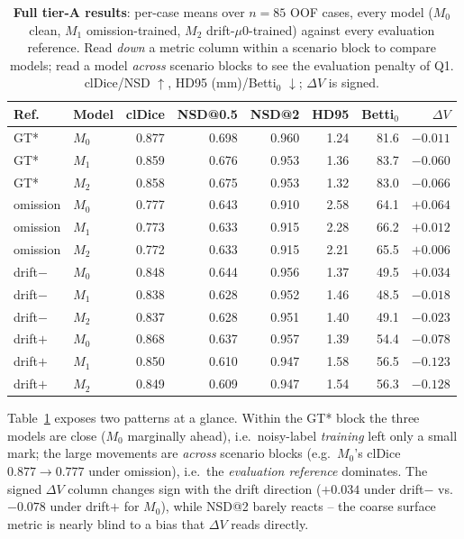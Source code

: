 \documentclass[
    bookmarks, bookmarksnumbered, bookmarksopen,
    colorlinks=true, citecolor=blue, linkcolor=blue, urlcolor=blue
]{techrep}
\begin{document}
\begin{table}[htb]
  \centering
  \caption{\textbf{Full tier-A results}: per-case means over $n{=}85$ OOF cases, every model
  ($M_0$ clean, $M_1$ omission-trained, $M_2$ drift-$\mu0$-trained) against every evaluation
  reference. Read \emph{down} a metric column within a scenario block to compare models; read a
  model \emph{across} scenario blocks to see the evaluation penalty of Q1. clDice/NSD $\uparrow$,
  HD95 (mm)/Betti$_0$ $\downarrow$; $\Delta V$ is signed.}
  \label{tab:full}
  \small
  \begin{tabular}{llrrrrrr}
    \toprule
    Ref. & Model & clDice & NSD@0.5 & NSD@2 & HD95 & Betti$_0$ & $\Delta V$ \\
    \midrule
    GT* & $M_0$ & 0.877 & 0.698 & 0.960 & 1.24 & 81.6 & $-0.011$ \\
    GT* & $M_1$ & 0.859 & 0.676 & 0.953 & 1.36 & 83.7 & $-0.060$ \\
    GT* & $M_2$ & 0.858 & 0.675 & 0.953 & 1.32 & 83.0 & $-0.066$ \\
    \midrule
    omission & $M_0$ & 0.777 & 0.643 & 0.910 & 2.58 & 64.1 & $+0.064$ \\
    omission & $M_1$ & 0.773 & 0.633 & 0.915 & 2.28 & 66.2 & $+0.012$ \\
    omission & $M_2$ & 0.772 & 0.633 & 0.915 & 2.21 & 65.5 & $+0.006$ \\
    \midrule
    drift$-$ & $M_0$ & 0.848 & 0.644 & 0.956 & 1.37 & 49.5 & $+0.034$ \\
    drift$-$ & $M_1$ & 0.838 & 0.628 & 0.952 & 1.46 & 48.5 & $-0.018$ \\
    drift$-$ & $M_2$ & 0.837 & 0.628 & 0.951 & 1.40 & 49.1 & $-0.023$ \\
    \midrule
    drift$+$ & $M_0$ & 0.868 & 0.637 & 0.957 & 1.39 & 54.4 & $-0.078$ \\
    drift$+$ & $M_1$ & 0.850 & 0.610 & 0.947 & 1.58 & 56.5 & $-0.123$ \\
    drift$+$ & $M_2$ & 0.849 & 0.609 & 0.947 & 1.54 & 56.3 & $-0.128$ \\
    \bottomrule
  \end{tabular}
\end{table}

Table~\ref{tab:full} exposes two patterns at a glance. Within the GT* block the three models are
close ($M_0$ marginally ahead), i.e.\ noisy-label \emph{training} left only a small mark; the
large movements are \emph{across} scenario blocks (e.g.\ $M_0$'s clDice $0.877\!\to\!0.777$ under
omission), i.e.\ the \emph{evaluation reference} dominates. The signed $\Delta V$ column changes
sign with the drift direction ($+0.034$ under drift$-$ vs.\ $-0.078$ under drift$+$ for $M_0$),
while NSD@2 barely reacts -- the coarse surface metric is nearly blind to a bias that $\Delta V$
reads directly.
\end{document}
